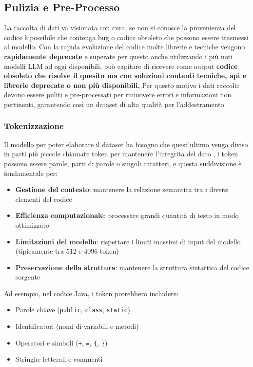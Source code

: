 \documentclass[12pt,a4paper,openright,twoside]{book}
\begin{document}
\subsection{Pulizia e Pre-Processo}
La raccolta di dati va visionata con cura, se non si conosce la provenienza del codice è possibile che contenga bug o codice obsoleto che possono essere trasmessi al modello.
Con la rapida evoluzione del codice molte librerie e tecniche vengono \textbf{rapidamente deprecate} e superate per questo anche utilizzando i più noti modelli LLM ad oggi disponibili, può capitare di ricevere come output \textbf{codice obsoleto che risolve il quesito ma con soluzioni contenti tecniche, api e librerie deprecate o non più disponibili.}
Per questo motivo i dati raccolti devono essere puliti e pre-processati per rimuovere errori e informazioni non pertinenti, garantendo così un dataset di alta qualità per l'addestramento.
\subsubsection{Tokenizzazione}
Il modello per poter elaborare il dataset ha bisogno che quest'ultimo venga diviso in parti più piccole chiamate token per mantenere l'integrita del dato \cite{stanford-codegen},
i token possono essere parole, parti di parole o singoli caratteri, e questa suddivisione è fondamentale per:

\begin{itemize}
    \item \textbf{Gestione del contesto}: mantenere la relazione semantica tra i diversi elementi del codice
    \item \textbf{Efficienza computazionale}: processare grandi quantità di testo in modo ottimizzato
    \item \textbf{Limitazioni del modello}: rispettare i limiti massimi di input del modello (tipicamente tra 512 e 4096 token)
    \item \textbf{Preservazione della struttura}: mantenere la struttura sintattica del codice sorgente
\end{itemize}

Ad esempio, nel codice Java, i token potrebbero includere:
\begin{itemize}
    \item Parole chiave (\texttt{public}, \texttt{class}, \texttt{static})
    \item Identificatori (nomi di variabili e metodi)
    \item Operatori e simboli (\texttt{+}, \texttt{=}, \texttt{\{}, \texttt{\}})
    \item Stringhe letterali e commenti
\end{itemize}
\end{document}
